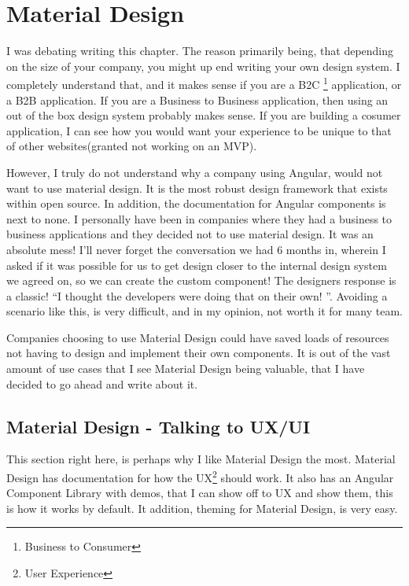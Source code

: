 
\section{ Material Design }

I was debating writing this chapter. The reason primarily being, that depending
on the size of your company, you might up end writing your own design system. I
completely understand that, and it makes sense if you are a B2C
\footnote{Business to Consumer} application, or a B2B application. If you are a
Business to Business application, then using an out of the box design system
probably makes sense. If you are building a cosumer application, I can see how
you would want your experience to be unique to that of other websites(granted
not working on an MVP).

However, I truly do not understand why a company using Angular, would not want
to use material design. It is the most robust design framework that exists
within open source. In addition, the documentation for Angular components is
next to none. I personally have been in companies where they had a business
to business applications and they decided not to use material design. It was an
absolute mess! I'll never forget the conversation we had 6 months in, wherein I
asked if it was possible for us to get design closer to the internal design
system we agreed on, so we can create the custom component! The designers
response is a classic! ``I thought the developers were doing that on their own!
''. Avoiding a scenario like this, is very difficult, and in my opinion, not
worth it for many team.

Companies choosing to use Material Design could have saved loads of resources
not having to design and implement their own components. It is out of the vast
amount of use cases that I see Material Design being valuable, that I have
decided to go ahead and write about it.

\subsection{ Material Design - Talking to UX/UI }
This section right here, is perhaps why I like Material Design the most.
Material Design has documentation for how the UX\footnote{User Experience}
should work. It also has an Angular Component Library with demos, that I can
show off to UX and show them, this is how it works by default. It addition,
theming for Material Design, is very easy.

